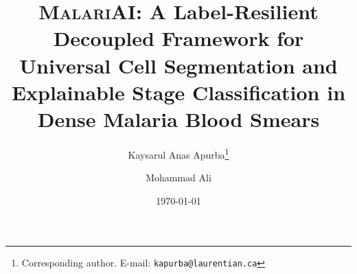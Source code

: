 \documentclass[10pt,twocolumn]{article}
\newcommand{\malariai}{\textsc{MalariAI}}
\begin{document}
\title{%
  \textbf{\malariai: A Label-Resilient Decoupled Framework for Universal
  Cell Segmentation and Explainable Stage Classification in Dense Malaria
  Blood Smears}%
}

\author[1]{Kaysarul Anas Apurba\thanks{Corresponding author.
  E-mail: \texttt{kapurba@laurentian.ca}}}
\author[2]{Mohammad Ali}


\setlength{\affilsep}{0.5em}
\date{\today}
\maketitle
\thispagestyle{empty}
\end{document}

